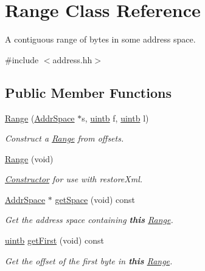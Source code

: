\hypertarget{class_range}{}\section{Range Class Reference}
\label{class_range}


A contiguous range of bytes in some address space.  




{\ttfamily \#include $<$address.\+hh$>$}

\subsection*{Public Member Functions}
\begin{DoxyCompactItemize}
\item 
\mbox{\hyperlink{class_range_a208021cd8c43af2067942ae261fd833b}{Range}} (\mbox{\hyperlink{class_addr_space}{Addr\+Space}} $\ast$s, \mbox{\hyperlink{types_8h_a2db313c5d32a12b01d26ac9b3bca178f}{uintb}} f, \mbox{\hyperlink{types_8h_a2db313c5d32a12b01d26ac9b3bca178f}{uintb}} l)
\begin{DoxyCompactList}\small\item\em Construct a \mbox{\hyperlink{class_range}{Range}} from offsets. \end{DoxyCompactList}\item 
\mbox{\hyperlink{class_range_aa5fc8bb184422b8e1c42584475979f10}{Range}} (void)
\begin{DoxyCompactList}\small\item\em \mbox{\hyperlink{class_constructor}{Constructor}} for use with restore\+Xml. \end{DoxyCompactList}\item 
\mbox{\hyperlink{class_addr_space}{Addr\+Space}} $\ast$ \mbox{\hyperlink{class_range_aca96ab5fbb1da6940d807547a9d9ed30}{get\+Space}} (void) const
\begin{DoxyCompactList}\small\item\em Get the address space containing {\bfseries{this}} \mbox{\hyperlink{class_range}{Range}}. \end{DoxyCompactList}\item 
\mbox{\hyperlink{types_8h_a2db313c5d32a12b01d26ac9b3bca178f}{uintb}} \mbox{\hyperlink{class_range_a40c5034428ad9d55e1c4fd4429d3ab45}{get\+First}} (void) const
\begin{DoxyCompactList}\small\item\em Get the offset of the first byte in {\bfseries{this}} \mbox{\hyperlink{class_range}{Range}}. \end{DoxyCompactList}\item 

\end{DoxyCompactItemize}
